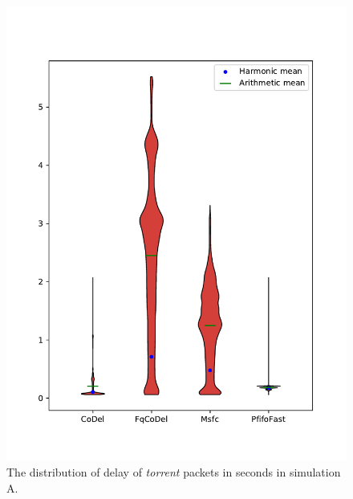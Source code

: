 \begin{figure}
	\centering
	\includegraphics[width=137mm]{drawings/type6-delay-down_A}
	\caption{The distribution of delay of \emph{torrent} packets in seconds in simulation A.}
	\label{fig:torrent_delay}
\end{figure}



